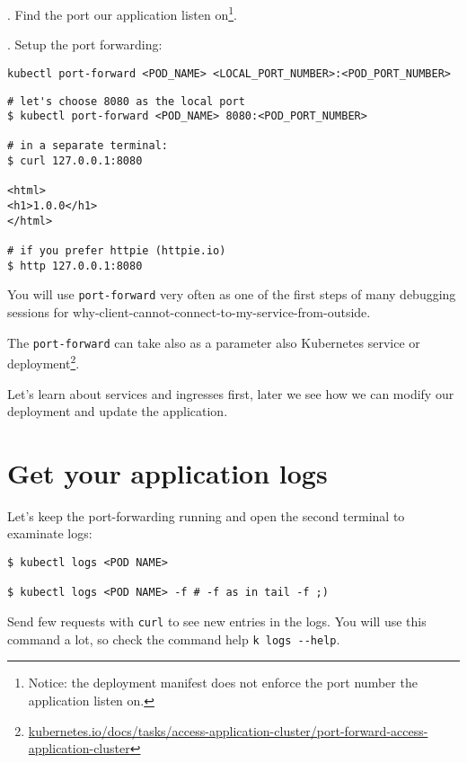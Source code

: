 \documentclass[12pt, letterpaper]{article}
\begin{document}
. Find the port our application listen on\footnote{Notice: the deployment manifest does not enforce the port number the application listen on.}.

. Setup the port forwarding:

\begin{verbatim}
kubectl port-forward <POD_NAME> <LOCAL_PORT_NUMBER>:<POD_PORT_NUMBER>
\end{verbatim}

\begin{verbatim}
# let's choose 8080 as the local port
$ kubectl port-forward <POD_NAME> 8080:<POD_PORT_NUMBER>

# in a separate terminal:
$ curl 127.0.0.1:8080

<html>
<h1>1.0.0</h1>
</html>

# if you prefer httpie (httpie.io)
$ http 127.0.0.1:8080
\end{verbatim}

\smallskip

You will use \verb|port-forward| very often as one of the first steps of many debugging sessions for why-client-cannot-connect-to-my-service-from-outside.

\bigskip

The \verb|port-forward| can take also as a parameter also Kubernetes service or deployment\footnote{\href{https://kubernetes.io/docs/tasks/access-application-cluster/port-forward-access-application-cluster/}{kubernetes.io/docs/tasks/access-application-cluster/port-forward-access-application-cluster}}.

\bigskip
Let's learn about services and ingresses first, later 
we see how we can modify our deployment and update the application.

\section{Get your application logs}
Let's keep the port-forwarding running and open the second terminal to examinate logs:

\begin{verbatim}
$ kubectl logs <POD NAME>

$ kubectl logs <POD NAME> -f # -f as in tail -f ;)
\end{verbatim}

Send few requests with \verb|curl| to see new entries in the logs. You will use this command a lot, so check the command help \verb|k logs --help|.
\end{document}
